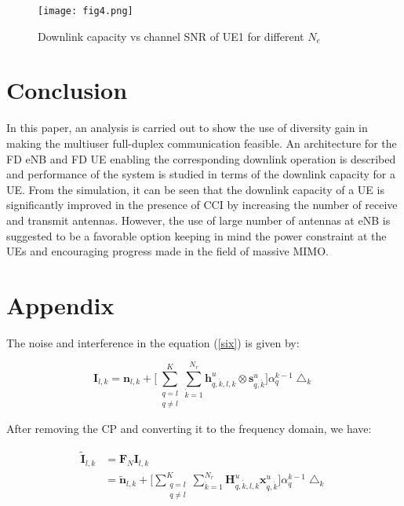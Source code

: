\documentclass[conference]{IEEEtran}
\begin{document}
\begin{figure}
\centering
\texttt{[image: fig4.png]}
\vspace{-0.5em}
   \caption{Downlink capacity vs channel SNR of UE1 for different $N_e$}
   \vspace{-0.45em}
   \label{ffour}
      \vspace{-1.25em}
\end{figure}


\section{Conclusion}
 In this paper, an analysis is carried out to show the use of diversity gain in making the multiuser full-duplex communication feasible. An architecture for the FD eNB and FD UE enabling the corresponding downlink operation is described and performance of the system is studied in terms of the downlink capacity for a UE. From the simulation, it can be seen that the downlink capacity of a UE is significantly improved in the presence of CCI by increasing the number of receive and transmit antennas. However, the use of large number of antennas at eNB is suggested to be a favorable option keeping in mind the power constraint at the UEs and encouraging progress made in the field of massive MIMO. 
 

\section*{Appendix}

The noise and interference in the equation (\ref{six}) is given by:

\begin{equation}
\label{sixteen}
 \mathbf{I}_{l,k} = \mathbf{n}_{l,k} + \Big [ \sum_{\substack{ q=l \\ q \neq l}}^{K} \sum_{\acute{k}=1}^{N_r} \mathbf{h}^u_{q,\acute{k},l,k} \otimes \mathbf{s}^u_{q,\acute{k}} \Big ] \alpha^{k-1}_{q}  \bigtriangleup_k
\end{equation}
       
 After removing the CP and converting it to the frequency domain, we have:
 
 \begin{equation}
\label{seventeen}
\begin{split}
  \mathbf{\tilde{I}}_{l,k} &= \mathbf{F}_N \mathbf{I}_{l,k} \\
   &= \mathbf{\tilde{n}}_{l,k} + \Big [ \sum_{\substack{ q=l \\ q \neq l}}^{K} \sum_{\acute{k}=1}^{N_r} \mathbf{H}^u_{q,\acute{k},l,k} \mathbf{x}^u_{q,\acute{k}} \Big ] \alpha^{k-1}_{q}  \bigtriangleup_k
   \end{split}
\end{equation}
\end{document}
